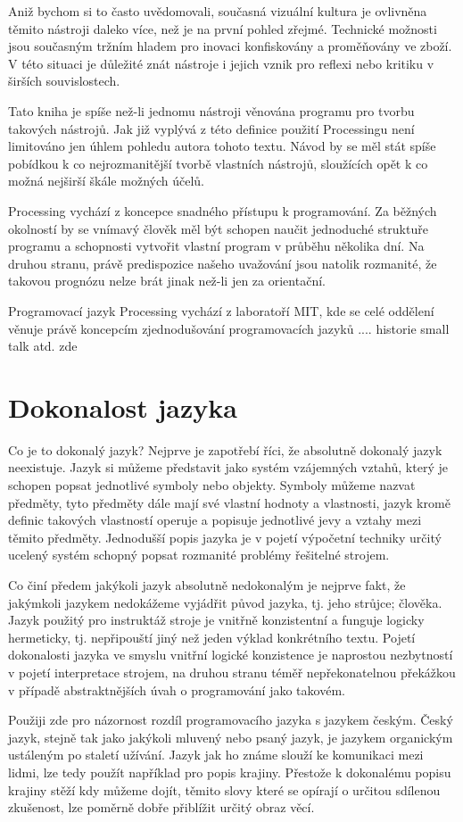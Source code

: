 \documentclass[11pt]{book}
\newcommand{\oddil}[1]{\section{#1}\label{sec:#1}}
\begin{document}
Aniž bychom si to často uvědomovali, současná vizuální kultura je ovlivněna těmito nástroji daleko více, než je na první pohled zřejmé. Technické možnosti jsou současným tržním hladem pro inovaci konfiskovány a proměňovány ve zboží. V této situaci je důležité znát nástroje i jejich vznik pro reflexi nebo kritiku v širších souvislostech.

Tato kniha je spíše než-li jednomu nástroji věnována programu pro tvorbu takových nástrojů. Jak již vyplývá z této definice použití Processingu není limitováno jen úhlem pohledu autora tohoto textu. Návod by se měl stát spíše pobídkou k co nejrozmanitější tvorbě vlastních nástrojů, sloužících opět k co možná nejširší škále možných účelů.

Processing vychází z koncepce snadného přístupu k programování. Za běžných okolností by se vnímavý člověk měl být schopen naučit jednoduché struktuře programu a schopnosti vytvořit vlastní program v průběhu několika dní. Na druhou stranu, právě predispozice našeho uvažování jsou natolik rozmanité, že takovou prognózu nelze brát jinak než-li jen za orientační.


Programovací jazyk Processing vychází z laboratoří MIT, kde se celé oddělení věnuje právě koncepcím zjednodušování programovacích jazyků .... historie small talk atd. zde


\oddil{Dokonalost jazyka}

Co je to dokonalý jazyk? Nejprve je zapotřebí říci, že absolutně dokonalý jazyk neexistuje. Jazyk si můžeme představit jako systém vzájemných vztahů, který je schopen popsat jednotlivé symboly nebo objekty. Symboly můžeme nazvat předměty, tyto předměty dále mají své vlastní hodnoty a vlastnosti, jazyk kromě definic takových vlastností operuje a popisuje jednotlivé jevy a vztahy mezi těmito předměty. Jednodušší popis jazyka je v pojetí výpočetní techniky určitý ucelený systém schopný popsat rozmanité problémy řešitelné strojem.

Co činí předem jakýkoli jazyk absolutně nedokonalým je nejprve fakt, že jakýmkoli jazykem nedokážeme vyjádřit původ jazyka, tj. jeho strůjce; člověka. Jazyk použitý pro instruktáž stroje je vnitřně konzistentní a funguje logicky hermeticky, tj. nepřipouští jiný než jeden výklad konkrétního textu. Pojetí dokonalosti jazyka ve smyslu vnitřní logické konzistence je naprostou nezbytností v pojetí interpretace strojem, na druhou stranu téměř nepřekonatelnou překážkou v případě abstraktnějších úvah o programování jako takovém.

Použiji zde pro názornost rozdíl programovacího jazyka s jazykem českým. Český jazyk, stejně tak jako jakýkoli mluvený nebo psaný jazyk, je jazykem organickým ustáleným po staletí užívání. Jazyk jak ho známe slouží ke komunikaci mezi lidmi, lze tedy použít například pro popis krajiny. Přestože k dokonalému popisu krajiny stěží kdy můžeme dojít, těmito slovy které se opírají o určitou sdílenou zkušenost, lze poměrně dobře přiblížit určitý obraz věcí.
\end{document}
